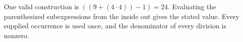 One valid construction is $\boxed{((9+(4\cdot 4))-1)=24}$. Evaluating the parenthesized subexpressions from the inside out gives the stated value. Every supplied occurrence is used once, and the denominator of every division is nonzero.

